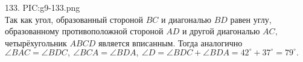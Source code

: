 133. {{PIC:g9-133.png}}\\
Так как угол, образованный стороной $BC$ и диагональю $BD$ равен углу, образованному противоположной стороной $AD$ и другой диагональю $AC,$ четырёхугольник $ABCD$ является вписанным. Тогда аналогично $\angle BAC=\angle BDC,\ \angle BCA=\angle BDA,\ \angle D=\angle BDC+\angle BDA=42^\circ+37^\circ=79^\circ.$\\
